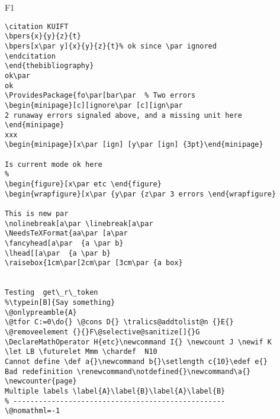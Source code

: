 \documentclass{article}
\begin{document}
\begin{filecontents+}{F1}
\begin{Verbatim}
\citation KUIFT
\bpers{x}{y}{z}{t}
\bpers[x\par y]{x}{y}{z}{t}% ok since \par ignored
\endcitation
\end{thebibliography}
ok\par
ok
\ProvidesPackage{fo\par[bar\par  % Two errors
\begin{minipage}[c][ignore\par [c][ign\par
2 runaway errors signaled above, and a missing unit here
\end{minipage}
xxx
\begin{minipage}[x\par [ign] [y\par [ign] {3pt}\end{minipage}

Is current mode ok here
%
\begin{figure}[x\par etc \end{figure}
\begin{wrapfigure}[x\par {y\par {z\par 3 errors \end{wrapfigure}

This is new par
\nolinebreak[a\par \linebreak[a\par
\NeedsTeXFormat{aa\par [a\par
\fancyhead[a\par  {a \par b}
\lhead[[a\par  {a \par b}
\raisebox{1cm\par[2cm\par [3cm\par {a box}


Testing  get\_r\_token 
%\typein[B]{Say something} 
\@onlypreamble{A} 
\@tfor C:=0\do{} \@cons D{} \tralics@addtolist@n {}E{}
\@removeelement {}{}F\@selective@sanitize[]{}G
\DeclareMathOperator H{etc}\newcommand I{} \newcount J \newif K
\let LB \futurelet Mmm \chardef  N10 
Cannot define \def a{}\newcommand b{}\setlength c{10}\edef e{}
Bad redefinition \renewcommand\notdefined{}\newcommand\a{}
\newcounter{page}
Multiple labels \label{A}\label{B}\label{A}\label{B}
% --------------------------------------------------
\@nomathml=-1



\end{Verbatim}
\end{filecontents+}
\end{document}
